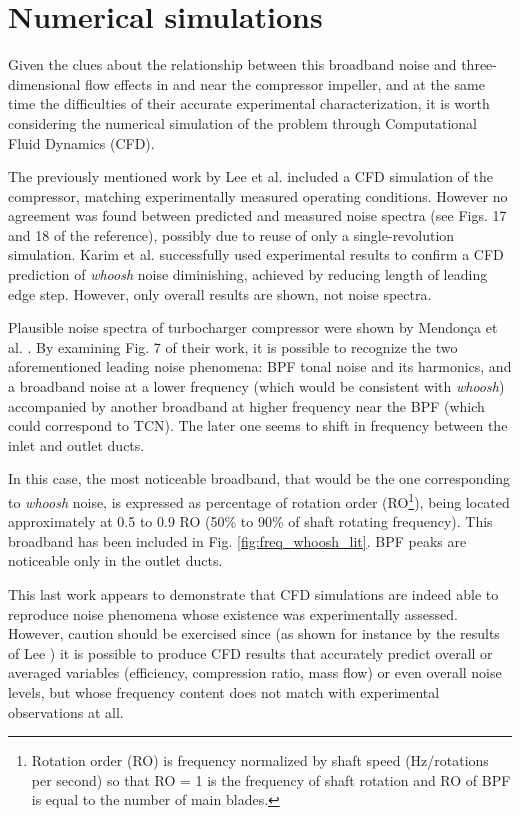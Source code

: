 \section{Numerical simulations}

Given the clues about the relationship between this broadband noise and three-dimensional flow effects in and near the compressor impeller, and at the same time the difficulties of their accurate experimental characterization, it is worth considering the numerical simulation of the problem through Computational Fluid Dynamics (CFD).

The previously mentioned work by Lee et al. \cite{lee2011control} included a CFD simulation of the compressor, matching experimentally measured operating conditions. However no agreement was found between predicted and measured noise spectra (see Figs. 17 and 18 of the reference), possibly due to reuse of only a single-revolution simulation. Karim et al. \cite{karim2013computational} successfully used experimental results to confirm a CFD prediction of \emph{whoosh} noise diminishing, achieved by reducing length of leading edge step. However, only overall results are shown, not noise spectra.

Plausible noise spectra of turbocharger compressor were shown by Mendonça et al. \cite{mendonca2012simulation}. By examining Fig. 7 of their work, it is possible to recognize the two aforementioned leading noise phenomena: BPF tonal noise and its harmonics, and a broadband noise at a lower frequency (which would be consistent with \emph{whoosh}) accompanied by another broadband at higher frequency near the BPF (which could correspond to TCN). The later one seems to shift in frequency between the inlet and outlet ducts. 

In this case, the most noticeable broadband, that would be the one corresponding to \emph{whoosh} noise, is expressed as percentage of rotation order (RO\footnote{Rotation order (RO) is frequency normalized by shaft speed (Hz/rotations per second) so that RO = 1 is the frequency of shaft rotation and RO of BPF is equal to the number of main blades.}), being located approximately at 0.5 to 0.9 RO (50\% to 90\% of shaft rotating frequency). This broadband has been included in Fig. \ref{fig:freq_whoosh_lit}. BPF peaks are noticeable only in the outlet ducts. 

This last work appears to demonstrate that CFD simulations are indeed able to reproduce noise phenomena whose existence was experimentally assessed. However, caution should be exercised since (as shown for instance by the results of Lee \cite{lee2011control}) it is possible to produce CFD results that accurately predict overall or averaged variables (efficiency, compression ratio, mass flow) or even overall noise levels, but whose frequency content does not match with experimental observations at all.

